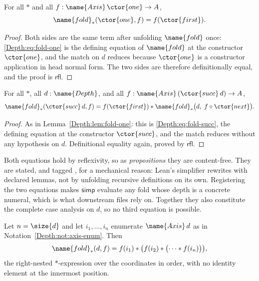 \begin{lemma}
\label{Depth:lem:fold-one}
For all $\ast$ and all $f : \name{Axis}\,\ctor{one} \to A$,
\[
  \name{fold}_{\ast}(\ctor{one}, f) = f(\ctor{first}).
\]
\end{lemma}

\begin{proof}
Both sides are the same term after unfolding $\name{fold}$ once: \eqref{Depth:eq:fold-one}
is the defining equation of $\name{fold}$ at the constructor $\ctor{one}$, and the match
on $d$ reduces because $\ctor{one}$ is a constructor application in head normal
form.  The two sides are therefore definitionally equal, and the proof is
$\mathsf{rfl}$.
\end{proof}

\begin{lemma}
\label{Depth:lem:fold-succ}
For all $\ast$, all $d : \name{Depth}$, and all $f : \name{Axis}\,(\ctor{succ}\, d) \to A$,
\[
  \name{fold}_{\ast}(\ctor{succ}\, d, f)
    = f(\ctor{first}) \ast \name{fold}_{\ast}\bigl(d,\; f \circ \ctor{next}\bigr).
\]
\end{lemma}

\begin{proof}
As in Lemma~\ref{Depth:lem:fold-one}: this is \eqref{Depth:eq:fold-succ}, the defining
equation at the constructor $\ctor{succ}$, and the match reduces without any
hypothesis on $d$.  Definitional equality again, proved by $\mathsf{rfl}$.
\end{proof}

\begin{remark}\label{Depth:rem:simp}
Both equations hold by reflexivity, so as \emph{propositions} they are
content-free.  They are stated, and tagged , for a mechanical
reason: Lean's simplifier rewrites with declared lemmas, not by unfolding
recursive definitions on its own.  Registering the two equations makes
$\mathsf{simp}$ evaluate any fold whose depth is a concrete numeral, which is
what downstream files rely on.  Together they also constitute the complete
case analysis on $d$, so no third equation is possible.
\end{remark}

\begin{proposition}\label{Depth:prop:fold-expansion}
Let $n = \size{d}$ and let $i_1, \dots, i_n$ enumerate $\name{Axis}\,d$ as in
Notation~\ref{Depth:not:axis-enum}.  Then
\[
  \name{fold}_{\ast}(d, f)
    = f(i_1) \ast \bigl( f(i_2) \ast \bigl( \cdots \ast f(i_n) \bigr) \bigr),
\]
the right-nested $\ast$-expression over the coordinates in order, with no
identity element at the innermost position.
\end{proposition}

